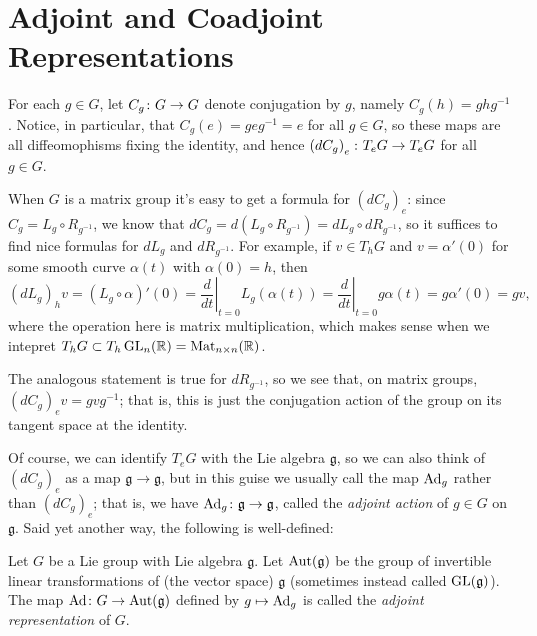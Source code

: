 
\section{Adjoint and Coadjoint Representations}
\label{sec:adjoint representations}

For each $g \in G$, let $C_g \colon\thinspace\! G \to G$ denote conjugation by $g$, namely $C_g(h) = ghg^{-1}$. Notice, in particular, that $C_g(e) = geg^{-1} = e$ for all $g \in G$, so these maps are all diffeomophisms fixing the identity, and hence $\left(dC_g\right)_e \colon\thinspace\! T_e G \to T_e G$ for all $g \in G$. 

When $G$ is a matrix group it's easy to get a formula for $\left(dC_g\right)_e$: since $C_g = L_g \circ R_{g^{-1}}$, we know that $dC_g = d(L_g \circ R_{g^{-1}}) = dL_g \circ dR_{g^{-1}}$, so it suffices to find nice formulas for $dL_g$ and $dR_{g^{-1}}$. For example, if $v \in T_h G$ and $v = \alpha'(0)$ for some smooth curve $\alpha(t)$ with $\alpha(0)=h$, then
\[
	\left(dL_g\right)_h v = \left(L_g \circ \alpha\right)'(0) = \left. \frac{d}{dt} \right|_{t=0} L_g(\alpha(t)) = \left. \frac{d}{dt} \right|_{t=0} g\alpha(t) = g\alpha'(0) = gv,
\]
where the operation here is matrix multiplication, which makes sense when we intepret $T_hG \subset T_h \operatorname{GL}_n(\mathbb{R}) = \operatorname{Mat}_{n \times n}(\mathbb{R})$.

The analogous statement is true for $dR_{g^{-1}}$, so we see that, on matrix groups, $\left(dC_g\right)_ev = gvg^{-1}$; that is, this is just the conjugation action of the group on its tangent space at the identity.

Of course, we can identify $T_eG$ with the Lie algebra $\mathfrak{g}$, so we can also think of $\left(dC_g\right)_e$ as a map $\mathfrak{g} \to \mathfrak{g}$, but in this guise we usually call the map $\operatorname{Ad}_g$ rather than $\left(dC_g\right)_e$; that is, we have $\operatorname{Ad}_g \colon\thinspace\! \mathfrak{g} \to \mathfrak{g}$, called the \emph{adjoint action} of $g \in G$ on $\mathfrak{g}$. Said yet another way, the following is well-defined:

\begin{definition}\label{def:adjoint representation}
	Let $G$ be a Lie group with Lie algebra $\mathfrak{g}$. Let $\operatorname{Aut}(\mathfrak{g})$ be the group of invertible linear transformations of (the vector space) $\mathfrak{g}$ (sometimes instead called $\operatorname{GL}(\mathfrak{g})$). The map $\operatorname{Ad} \colon\thinspace\! G \to \operatorname{Aut}(\mathfrak{g})$ defined by $g \mapsto \operatorname{Ad}_g$ is called the \emph{adjoint representation} of $G$.
\end{definition}

